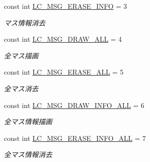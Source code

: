 \begin{DoxyCompactItemize}
const int \hyperlink{class_reversi_form_1_1_reversi_const_a6dbc853256b5e2704474c01c329b3a52}{L\+C\+\_\+\+M\+S\+G\+\_\+\+E\+R\+A\+S\+E\+\_\+\+I\+N\+FO} = 3
\begin{DoxyCompactList}\small\item\em マス情報消去 \end{DoxyCompactList}\item 
\mbox{\label{class_reversi_form_1_1_reversi_const_a111c89c737238b905857c2ab62018b26}} 
const int \hyperlink{class_reversi_form_1_1_reversi_const_a111c89c737238b905857c2ab62018b26}{L\+C\+\_\+\+M\+S\+G\+\_\+\+D\+R\+A\+W\+\_\+\+A\+LL} = 4
\begin{DoxyCompactList}\small\item\em 全マス描画 \end{DoxyCompactList}\item 
\mbox{\label{class_reversi_form_1_1_reversi_const_a3d4e378704f145b79de91103a1ee681e}} 
const int \hyperlink{class_reversi_form_1_1_reversi_const_a3d4e378704f145b79de91103a1ee681e}{L\+C\+\_\+\+M\+S\+G\+\_\+\+E\+R\+A\+S\+E\+\_\+\+A\+LL} = 5
\begin{DoxyCompactList}\small\item\em 全マス消去 \end{DoxyCompactList}\item 
\mbox{\label{class_reversi_form_1_1_reversi_const_a19ae5ea5e70166149b126d68362ed349}} 
const int \hyperlink{class_reversi_form_1_1_reversi_const_a19ae5ea5e70166149b126d68362ed349}{L\+C\+\_\+\+M\+S\+G\+\_\+\+D\+R\+A\+W\+\_\+\+I\+N\+F\+O\+\_\+\+A\+LL} = 6
\begin{DoxyCompactList}\small\item\em 全マス情報描画 \end{DoxyCompactList}\item 
\mbox{\label{class_reversi_form_1_1_reversi_const_a7d86ec48faf79a41508c9c0f6417aa54}} 
const int \hyperlink{class_reversi_form_1_1_reversi_const_a7d86ec48faf79a41508c9c0f6417aa54}{L\+C\+\_\+\+M\+S\+G\+\_\+\+E\+R\+A\+S\+E\+\_\+\+I\+N\+F\+O\+\_\+\+A\+LL} = 7
\begin{DoxyCompactList}\small\item\em 全マス情報消去 \end{DoxyCompactList}\item 

\end{DoxyCompactItemize}
